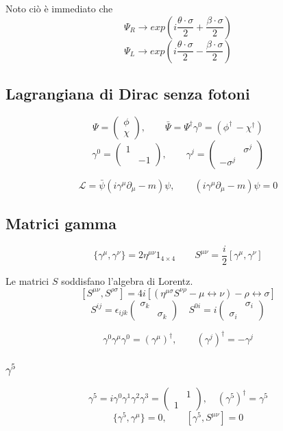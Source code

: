 \documentclass[12pt,a4paper]{article}
\begin{document}
	Noto ciò è immediato che
	\[ \Psi_R \rightarrow exp\left(i \dfrac{\theta\cdot\sigma}{2} + \dfrac{\beta\cdot\sigma}{2}\right) \]
	\[ \Psi_L \rightarrow exp\left(i \dfrac{\theta\cdot\sigma}{2} - \dfrac{\beta\cdot\sigma}{2}\right) \]
	
	\subsection{Lagrangiana di Dirac senza fotoni}
	\[ \Psi = \begin{pmatrix}
	\phi \\ \chi
	\end{pmatrix}, \qquad \bar{\Psi} = \Psi^\dagger\gamma^0 = (\phi^\dagger\, -\chi^\dagger) \]
	\[ \gamma^0 = \begin{pmatrix}
	1& \\ & -1
	\end{pmatrix},\qquad \gamma^j = \begin{pmatrix}
	& \sigma^j \\ -\sigma^j&
	\end{pmatrix} \]
	
	\[ \mathcal{L}= \bar{\psi} (i \gamma^\mu \partial_\mu - m) \psi, \qquad (i\gamma^\mu \partial_\mu - m) \psi = 0 \]
	
	\subsection{Matrici gamma}
	\[ \{ \gamma^\mu, \gamma^\nu \} = 2\eta^{\mu\nu} 1_{4\times4}\qquad S^{\mu\nu} = \dfrac{i}{2} [\gamma^\mu, \gamma^\nu] \]
	
	Le matrici $S$ soddisfano l'algebra di Lorentz.
	\[ [S^{\mu\nu}, S^{\rho\sigma}] = 4i [(\eta^{\mu\sigma} S^{\nu\rho} - \mu\leftrightarrow\nu) - \rho\leftrightarrow\sigma ] \]
	\[ S^{ij} = \epsilon_{ijk} \begin{pmatrix}
	\sigma_k& \\ & \sigma_k
	\end{pmatrix}
	\quad
	S^{0i} = i
	\begin{pmatrix}
	&\sigma_i \\ \sigma_i&
	\end{pmatrix} \]
	
	\[ \gamma^0 \gamma^\mu \gamma^0 = (\gamma^\mu )^\dagger, \qquad (\gamma^j)^\dagger = -\gamma^j \]
	\subsubsection*{$\gamma^5$}
	\[ \gamma^5 = i\gamma^0\gamma^1\gamma^2\gamma^3 = \begin{pmatrix}
	&1 \\ 1&
	\end{pmatrix},\quad (\gamma^5)^\dagger = \gamma^5 \]
	\[ \{\gamma^5,\gamma^\mu\} = 0,\qquad [\gamma^5,S^{\mu\nu}]=0 \]
	
\end{document}
